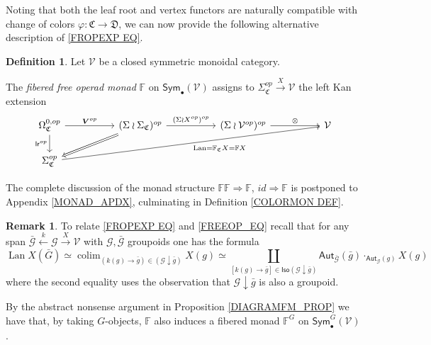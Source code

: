 \documentclass[a4paper,10pt
,draft
]{article}%
\numberwithin{equation}{section}
\numberwithin{figure}{section}
\theoremstyle{definition} %
\newtheorem{definition}[equation]{Definition}%
\newtheorem{remark}[equation]{Remark}%
\DeclareMathOperator{\colim}{colim}%
\DeclareMathOperator{\Lan}{Lan}%
\newcommand{\V}{\ensuremath{\mathcal V}}
\newcommand{\1}{\ensuremath{\mathbbm 1}}%
\begin{document}
Noting that both the leaf root and vertex functors are naturally compatible with change of colors 
$\varphi \colon \mathfrak{C} \to \mathfrak{D}$, 
we can now provide the following alternative 
description of \eqref{FROPEXP EQ}.



\begin{definition}\label{FREEOP DEF}
Let $\mathcal{V}$ be a closed symmetric monoidal category.

The \textit{fibered free operad monad} $\mathbb{F}$ on $\mathsf{Sym}_\bullet(\mathcal{V})$ 
assigns to 
$\Sigma_{\mathfrak{C}}^{op} \xrightarrow{X} \mathcal{V}$
the left Kan extension
\begin{equation}\label{FREEOP_EQ}
\begin{tikzcd}[column sep = 50pt]
	\Omega^{0,op}_{\mathfrak{C}}
	\arrow[d, "\mathsf{lr}^{op}"']
	\arrow[r, "\boldsymbol{V}^{op}"]
&
	(\Sigma \wr \Sigma_{\mathfrak{C}})^{op} \arrow[r, "(\Sigma \wr X^{op})^{op}"]
	\arrow[dl, Rightarrow]
&
	(\Sigma \wr \V^{op})^{op} \arrow[r, "\otimes"]
&
	\V
\\
	\Sigma^{op}_{\mathfrak{C}}
	\arrow[urrr, "\Lan = \mathbb F_{\mathfrak{C}} X = \mathbb F X"']
\end{tikzcd}
\end{equation}
\end{definition}
The complete discussion of the monad structure
$\mathbb{F}\mathbb{F} \Rightarrow \mathbb{F}$,
$id \Rightarrow \mathbb{F}$ is postponed to Appendix \ref{MONAD_APDX},
culminating in Definition \ref{COLORMON DEF}.


\begin{remark}\label{CONVER REM}
To relate \eqref{FROPEXP EQ} and \eqref{FREEOP_EQ} recall that 
for any span 
$\bar{\mathcal{G}} \overset{k}{\leftarrow} \mathcal{G} \xrightarrow{X} \mathcal{V}$
with $\mathcal{G},\bar{\mathcal{G}}$ groupoids
one has the formula
\[\Lan X (\bar{G}) \simeq 
\colim_{(k(g) \to \bar{g})\in (\mathcal{G} \downarrow \bar{g})} X(g) \simeq
\coprod_{[k(g) \to \bar{g}] 
\in \mathsf{Iso}(\mathcal{G} \downarrow \bar{g})}
\mathsf{Aut}_{\bar{\mathcal{G}}}(\bar{g})
\cdot_{\mathsf{Aut}_{\mathcal{G}}(g)}
X(g)
\]
where the second equality uses the observation that
$\mathcal{G} \downarrow \bar{g}$
is also a groupoid.
\end{remark}


By the abstract nonsense argument in 
Proposition \ref{DIAGRAMFM_PROP}
we have that, by taking $G$-objects, 
$\mathbb{F}$ also induces a fibered monad 
$\mathbb{F}^G$ on $\mathsf{Sym}^G_{\bullet}(\V)$.
\end{document}

